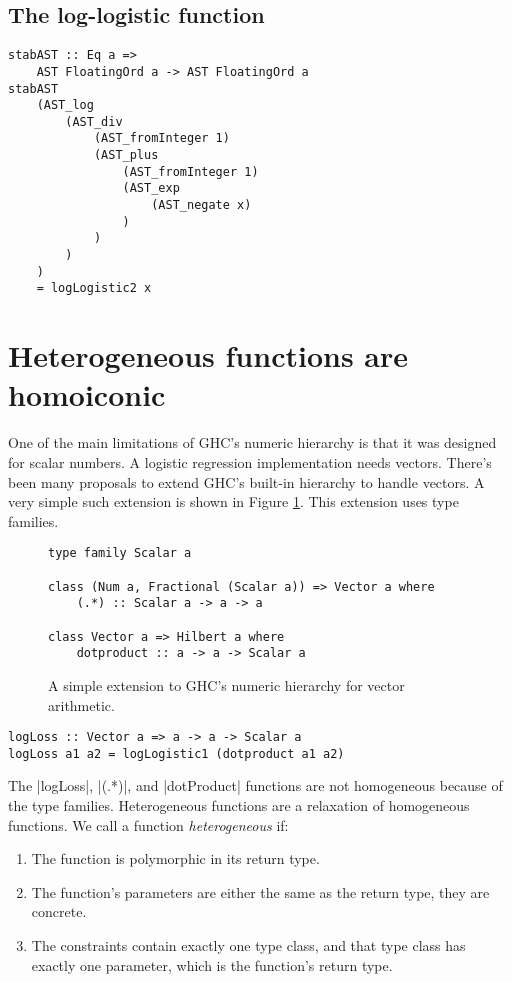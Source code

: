 \documentclass[preprint]{sigplanconf}
\theoremstyle{definition}
\begin{document}
\subsection{The log-logistic function}

\begin{lstlisting}
stabAST :: Eq a =>
    AST FloatingOrd a -> AST FloatingOrd a
stabAST
    (AST_log
        (AST_div
            (AST_fromInteger 1)
            (AST_plus
                (AST_fromInteger 1)
                (AST_exp
                    (AST_negate x)
                )
            )
        )
    )
    = logLogistic2 x
\end{lstlisting}

\section{Heterogeneous functions are homoiconic}


One of the main limitations of GHC's numeric hierarchy is that it was designed for scalar numbers.
A logistic regression implementation needs vectors.
There's been many proposals to extend GHC's built-in hierarchy to handle vectors.
A very simple such extension is shown in Figure \ref{code:vector}.
This extension uses type families.

\begin{figure}
\begin{lstlisting}
type family Scalar a

class (Num a, Fractional (Scalar a)) => Vector a where
    (.*) :: Scalar a -> a -> a

class Vector a => Hilbert a where
    dotproduct :: a -> a -> Scalar a
\end{lstlisting}
\caption{
    A simple extension to GHC's numeric hierarchy for vector arithmetic.
}
\label{code:vector}
\end{figure}

\begin{lstlisting}
logLoss :: Vector a => a -> a -> Scalar a
logLoss a1 a2 = logLogistic1 (dotproduct a1 a2)
\end{lstlisting}

The |logLoss|, |(.*)|, and |dotProduct| functions are not homogeneous because of the type families.
Heterogeneous functions are a relaxation of homogeneous functions.
We call a function \emph{heterogeneous} if:
\begin{enumerate}
\item
The function is polymorphic in its return type.
\item
The function's parameters are either the same as the return type, they are concrete.
\item
The constraints contain exactly one type class, and
that type class has exactly one parameter,
which is the function's return type.
\end{enumerate}
\end{document}
